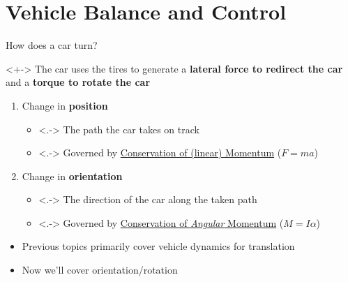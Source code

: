 \documentclass[aspectratio=169]{beamer}
\begin{document}
\section{Vehicle Balance and Control}
\begin{frame}{How does a car turn?}
    \onslide<+->{}
    \begin{block}{}<+->
        The car uses the tires to generate a \textbf{lateral force to redirect the car} and a \textbf{torque to rotate the car}
    \end{block}
    \begin{enumerate}
        \item<+-> Change in \textbf{position}
            \begin{itemize}
                \item<.-> The path the car takes on track
                \item<.-> Governed by \underline{Conservation of (linear) Momentum} (\(F=ma\))
            \end{itemize}
        \item<+-> Change in \textbf{orientation}
            \begin{itemize}
                \item<.-> The direction of the car along the taken path
                \item<.-> Governed by \underline{Conservation of \textit{Angular} Momentum} (\(M=I\alpha\))
            \end{itemize}
    \end{enumerate}

    \begin{itemize}
        \item<+-> Previous topics primarily cover vehicle dynamics for translation
        \item<+-> Now we'll cover orientation/rotation
    \end{itemize}
\end{frame}
\end{document}

